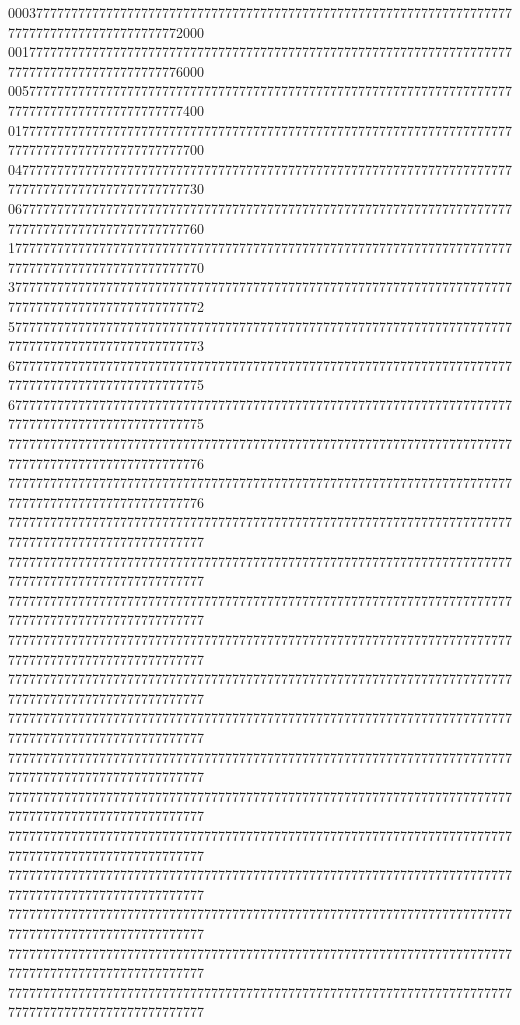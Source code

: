 \documentclass[letterpaper,10pt,english]{sphinxmanual}
\begin{document}
\begin{sphinxVerbatim}[commandchars=\\\{\},numbers=left,firstnumber=1,stepnumber=1]
0003777777777777777777777777777777777777777777777777777777777777777777777777777777777777777777772000
0017777777777777777777777777777777777777777777777777777777777777777777777777777777777777777777776000
0057777777777777777777777777777777777777777777777777777777777777777777777777777777777777777777777400
0177777777777777777777777777777777777777777777777777777777777777777777777777777777777777777777777700
0477777777777777777777777777777777777777777777777777777777777777777777777777777777777777777777777730
0677777777777777777777777777777777777777777777777777777777777777777777777777777777777777777777777760
1777777777777777777777777777777777777777777777777777777777777777777777777777777777777777777777777770
3777777777777777777777777777777777777777777777777777777777777777777777777777777777777777777777777772
5777777777777777777777777777777777777777777777777777777777777777777777777777777777777777777777777773
6777777777777777777777777777777777777777777777777777777777777777777777777777777777777777777777777775
6777777777777777777777777777777777777777777777777777777777777777777777777777777777777777777777777775
7777777777777777777777777777777777777777777777777777777777777777777777777777777777777777777777777776
7777777777777777777777777777777777777777777777777777777777777777777777777777777777777777777777777776
7777777777777777777777777777777777777777777777777777777777777777777777777777777777777777777777777777
7777777777777777777777777777777777777777777777777777777777777777777777777777777777777777777777777777
7777777777777777777777777777777777777777777777777777777777777777777777777777777777777777777777777777
7777777777777777777777777777777777777777777777777777777777777777777777777777777777777777777777777777
7777777777777777777777777777777777777777777777777777777777777777777777777777777777777777777777777777
7777777777777777777777777777777777777777777777777777777777777777777777777777777777777777777777777777
7777777777777777777777777777777777777777777777777777777777777777777777777777777777777777777777777777
7777777777777777777777777777777777777777777777777777777777777777777777777777777777777777777777777777
7777777777777777777777777777777777777777777777777777777777777777777777777777777777777777777777777777
7777777777777777777777777777777777777777777777777777777777777777777777777777777777777777777777777777
7777777777777777777777777777777777777777777777777777777777777777777777777777777777777777777777777777
7777777777777777777777777777777777777777777777777777777777777777777777777777777777777777777777777777
7777777777777777777777777777777777777777777777777777777777777777777777777777777777777777777777777777

\end{sphinxVerbatim}
\end{document}
